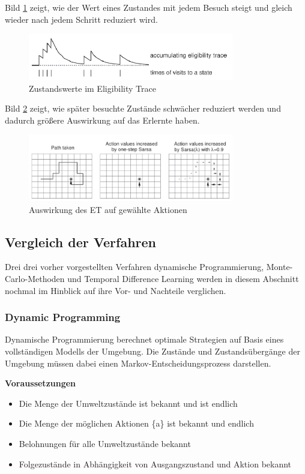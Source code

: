 \documentclass[10pt]{scrartcl}
\begin{document}
Bild \ref{fig:Trace} zeigt, wie der Wert eines Zustandes mit jedem Besuch steigt und gleich wieder nach jedem Schritt reduziert wird.
\begin{figure}[htbp]
	\centering	\includegraphics[width=0.8\textwidth]{Bilder/TraceDecay.png}
	\caption{Zustandswerte im Eligibility Trace}
	\label{fig:Trace}
\end{figure}
Bild \ref{fig:Trace1} zeigt, wie später besuchte Zustände schwächer reduziert werden und dadurch größere Auswirkung auf das Erlernte haben.
\begin{figure}[htbp]
	\centering	\includegraphics[width=0.8\textwidth]{Bilder/ETBild.jpg}
	\caption{Auswirkung des ET auf gewählte Aktionen}
	\label{fig:Trace1}
\end{figure}

\subsection{Vergleich der Verfahren}
Drei drei vorher vorgestellten Verfahren dynamische Programmierung, Monte-Carlo-Methoden und Temporal Difference Learning werden in diesem Abschnitt nochmal im Hinblick auf ihre Vor- und Nachteile verglichen.

\subsubsection{Dynamic Programming}
Dynamische Programmierung berechnet optimale Strategien auf Basis eines vollständigen Modells der Umgebung. Die Zustände und Zustandsübergänge der Umgebung müssen dabei einen Markov-Entscheidungsprozess darstellen.

\textbf{Voraussetzungen}
\begin{itemize}
\item{Die Menge der Umweltzustände ist bekannt und ist endlich}
\item{Die Menge der möglichen Aktionen \{a\} ist bekannt und endlich}
\item{Belohnungen für alle Umweltzustände bekannt}
\item{Folgezustände in Abhängigkeit von Ausgangszustand und Aktion bekannt}
\end{itemize}
\end{document}

